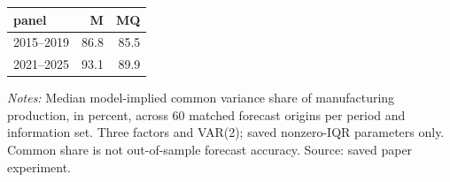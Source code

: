 \begin{threeparttable}
\begin{tabular}{lrr}
\toprule
panel & M & MQ \\
\midrule
2015--2019 & 86.8 & 85.5 \\
2021--2025 & 93.1 & 89.9 \\
\bottomrule
\end{tabular}
\begin{tablenotes}[flushleft]\footnotesize
\item \textit{Notes:} Median model-implied common variance share of manufacturing production, in percent, across 60 matched forecast origins per period and information set. Three factors and VAR(2); saved nonzero-IQR parameters only. Common share is not out-of-sample forecast accuracy. Source: saved paper experiment.
\end{tablenotes}
\end{threeparttable}

